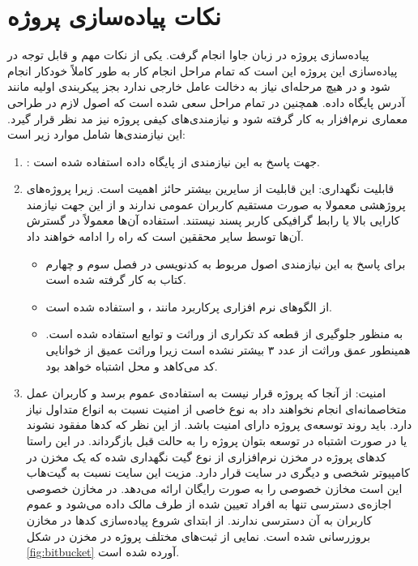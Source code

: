 \section{نکات پیاده‌سازی پروژه}

پیاده‌سازی پروژه در زبان جاوا انجام گرفت. یکی از نکات مهم و قابل توجه در پیاده‌سازی این پروژه این است که تمام مراحل انجام کار  به طور کاملاً خودکار انجام شود و در هیچ مرحله‌ای نیاز به دخالت عامل خارجی  ندارد بجز پیکربندی اولیه مانند آدرس پایگاه داده. همچنین در تمام مراحل سعی شده است که  اصول لازم در طراحی معماری نرم‌افزار به کار گرفته شود و نیازمندی‌های کیفی پروژه نیز مد نظر قرار گیرد. این نیازمندی‌ها شامل موارد زیر است:
\begin{enumerate}
\item 
{} : جهت پاسخ به این نیازمندی از پایگاه داده استفاده شده است.
\item
قابلیت نگهداری: این قابلیت از سایرین بیشتر حائز اهمیت است. زیرا پروژه‌های پروژهشی معمولا به صورت مستقیم کاربران عمومی ندارند و از این جهت نیازمند کارایی بالا یا رابط گرافیکی کاربر پسند نیستند. استفاده آن‌ها معمولاً در گسترش آن‌ها توسط سایر محققین است که راه را ادامه خواهند داد. 
\begin{itemize}
\item

 برای پاسخ به این نیازمندی اصول مربوط به کدنویسی  در فصل سوم و چهارم کتاب  \cite{martin2009clean} به کار گرفته شده است.
 \item
 از الگوهای نرم افزاری پرکاربرد مانند ،   و  استفاده شده است.
 \item
 به منظور جلوگیری از قطعه کد تکراری از وراثت و توابع  استفاده شده است. همینطور عمق وراثت از عدد ۳ بیشتر نشده است زیرا وراثت عمیق از خوانایی کد می‌کاهد و محل اشتباه خواهد بود. 
\end{itemize}
\item
امنیت: از آنجا که پروژه قرار نیست به استفاده‌ی عموم برسد و کاربران عمل متخاصمانه‌ای انجام نخواهند داد   به نوع خاصی از امنیت  نسبت به انواع متداول نیاز دارد.  باید روند توسعه‌ی پروژه دارای امنیت باشد. از این نظر که کدها مفقود نشوند یا در صورت اشتباه در توسعه بتوان پروژه را به حالت قبل بازگرداند. در این راستا کدهای پروژه در مخزن نرم‌افزاری از نوع گیت نگهداری شده که یک مخزن در کامپیوتر شخصی و دیگری در سایت  
قرار دارد. مزیت این سایت نسبت به گیت‌هاب این است مخازن خصوصی  را به صورت رایگان ارائه می‌دهد. در مخازن خصوصی  اجازه‌ی دسترسی تنها به  افراد تعیین شده از طرف مالک  داده می‌شود و عموم کاربران به آن دسترسی ندارند. از ابتدای شروع پیاده‌سازی کدها در مخازن بروزرسانی شده است. نمایی از ثبت‌های مختلف پروژه در مخزن در شکل \ref{fig:bitbucket}
آورده شده است. 
\end{enumerate}

